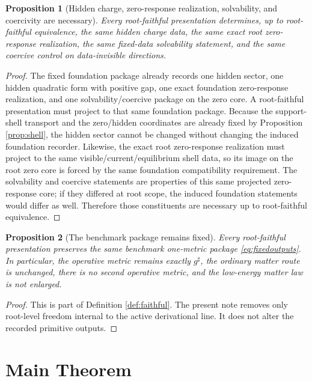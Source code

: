 \documentclass[11pt]{article}
\newcommand{\CompletedMetric}{g^{\sharp}}
\newtheorem{proposition}{Proposition}
\begin{document}
\begin{proposition}[Hidden charge, zero-response realization, solvability, and coercivity are necessary]
\label{prop:hidden}
Every root-faithful presentation determines, up to root-faithful equivalence, the same hidden charge data, the same exact root zero-response realization, the same fixed-data solvability statement, and the same coercive control on data-invisible directions.
\end{proposition}

\begin{proof}
The fixed foundation package already records one hidden sector, one hidden quadratic form with positive gap, one exact foundation zero-response realization, and one solvability/coercive package on the zero core. A root-faithful presentation must project to that same foundation package. Because the support-shell transport and the zero/hidden coordinates are already fixed by Proposition \ref{prop:shell}, the hidden sector cannot be changed without changing the induced foundation recorder. Likewise, the exact root zero-response realization must project to the same visible/current/equilibrium shell data, so its image on the root zero core is forced by the same foundation compatibility requirement. The solvability and coercive statements are properties of this same projected zero-response core; if they differed at root scope, the induced foundation statements would differ as well. Therefore those constituents are necessary up to root-faithful equivalence.
\end{proof}

\begin{proposition}[The benchmark package remains fixed]
\label{prop:benchmark}
Every root-faithful presentation preserves the same benchmark one-metric package \eqref{eq:fixedoutputs}. In particular, the operative metric remains exactly \(\CompletedMetric\), the ordinary matter route is unchanged, there is no second operative metric, and the low-energy matter law is not enlarged.
\end{proposition}

\begin{proof}
This is part of Definition \ref{def:faithful}. The present note removes only root-level freedom internal to the active derivational line. It does not alter the recorded primitive outputs.
\end{proof}

\section{Main Theorem}
\end{document}
